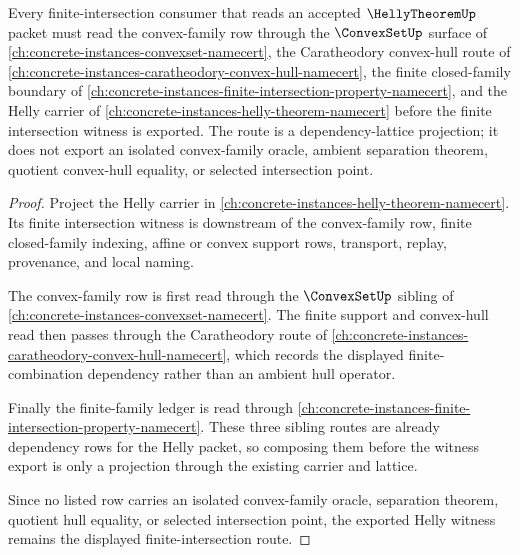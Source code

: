 \begin{theorem}
\label{thm:helly-carath-lattice-sibling-route}
Every finite-intersection consumer that reads an accepted $\HellyTheoremUp$ packet must read the convex-family row through the $\ConvexSetUp$ surface of \autoref{ch:concrete-instances-convexset-namecert}, the Caratheodory convex-hull route of \autoref{ch:concrete-instances-caratheodory-convex-hull-namecert}, the finite closed-family boundary of \autoref{ch:concrete-instances-finite-intersection-property-namecert}, and the Helly carrier of \autoref{ch:concrete-instances-helly-theorem-namecert} before the finite intersection witness is exported. The route is a dependency-lattice projection; it does not export an isolated convex-family oracle, ambient separation theorem, quotient convex-hull equality, or selected intersection point.
\end{theorem}
\begin{proof}
Project the Helly carrier in \autoref{ch:concrete-instances-helly-theorem-namecert}. Its finite intersection witness is downstream of the convex-family row, finite closed-family indexing, affine or convex support rows, transport, replay, provenance, and local naming.

The convex-family row is first read through the $\ConvexSetUp$ sibling of \autoref{ch:concrete-instances-convexset-namecert}. The finite support and convex-hull read then passes through the Caratheodory route of \autoref{ch:concrete-instances-caratheodory-convex-hull-namecert}, which records the displayed finite-combination dependency rather than an ambient hull operator.

Finally the finite-family ledger is read through \autoref{ch:concrete-instances-finite-intersection-property-namecert}. These three sibling routes are already dependency rows for the Helly packet, so composing them before the witness export is only a projection through the existing carrier and lattice.

Since no listed row carries an isolated convex-family oracle, separation theorem, quotient hull equality, or selected intersection point, the exported Helly witness remains the displayed finite-intersection route.
\end{proof}
